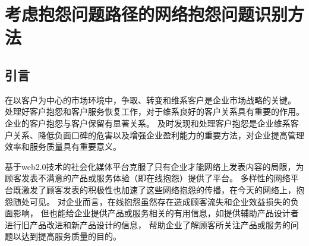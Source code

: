 \chapter{考虑抱怨问题路径的网络抱怨问题识别方法}\label{chapter:1}
\section{引言}\label{sec:1.1}
在以客户为中心的市场环境中，争取、转变和维系客户是企业市场战略的关键。
处理好客户抱怨和客户服务恢复工作，对于维系良好的客户关系具有重要的作用。
企业的客户抱怨与客户保留有显著关系\cite{coussement2008improving}。
及时发现和处理客户抱怨是企业维系客户关系、降低负面口碑的危害以及增强企业盈利能力的重要方法，对企业提高管理效率和服务质量具有重要意义。

基于web2.0技术的社会化媒体平台克服了只有企业才能网络上发表内容的局限，为顾客发表不满意的产品或服务体验（即在线抱怨）提供了平台。
多样性的网络平台既激发了顾客发表的积极性也加速了这些网络抱怨的传播，在今天的网络上，抱怨随处可见。
对企业而言，在线抱怨虽然存在造成顾客流失和企业效益损失的负面影响，
但也能给企业提供产品或服务相关的有用信息，如提供辅助产品设计者进行旧产品改进和新产品设计的信息\cite{jin2016makes}，
帮助企业了解顾客所关注产品或服务的问题以达到提高服务质量的目的。